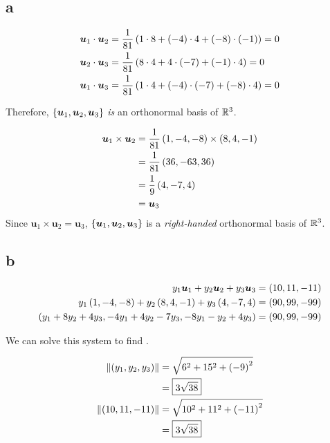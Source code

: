 \documentclass{article}
\begin{document}

\subsection*{a}

\begin{align*}
  \bm{u}_1 \cdot \bm{u}_2 &= \frac{1}{81} \left ( 1 \cdot 8 + \left ( -4 \right) \cdot 4 + \left ( -8 \right) \cdot \left ( -1 \right) \right) = 0 \\
  \bm{u}_2 \cdot \bm{u}_3 &= \frac{1}{81} \left ( 8 \cdot 4 + 4 \cdot \left ( -7 \right) + \left ( -1 \right) \cdot 4 \right) = 0 \\
  \bm{u}_1 \cdot \bm{u}_3 &= \frac{1}{81} \left ( 1 \cdot 4 + \left ( -4 \right) \cdot \left ( -7 \right) + \left ( -8 \right) \cdot 4 \right) = 0 \\
\end{align*}

Therefore, $\left \{ \bm{u}_1, \bm{u}_2, \bm{u}_3 \right \}$ \emph{is} an orthonormal basis of $\mathbb R^3$.

\begin{align*}
  \bm{u}_1 \times \bm{u}_2 &= \frac{1}{81} \left ( 1, -4, -8 \right) \times \left ( 8, 4, -1 \right) \\
                           &= \frac{1}{81} \left ( 36, -63, 36 \right) \\
                           &= \frac{1}{9} \left ( 4, -7, 4 \right) \\
                           &= \bm{u}_3 \\
\end{align*}
Since $\bm{u}_1 \times \bm{u}_2 = \bm{u}_3$, $\left \{ \bm{u}_1, \bm{u}_2, \bm{u}_3 \right \}$ is a \emph{right-handed} orthonormal basis of $\mathbb R^3$.


\subsection*{b}


\begin{align*}
  y_1 \bm{u}_1 + y_2 \bm{u}_2 + y_3 \bm{u}_3 &= \left ( 10, 11, -11 \right) \\
  y_1 \left ( 1, -4, -8 \right) + y_2 \left ( 8, 4, -1 \right) + y_3 \left ( 4, -7, 4 \right) &= \left ( 90, 99, -99 \right) \\
  \left ( y_1 + 8 y_2 + 4 y_3, -4 y_1 + 4 y_2 - 7 y_3, -8 y_1 - y_2 + 4y_3 \right) &= \left ( 90, 99, -99 \right) \\
\end{align*}

We can solve this system to find .

\begin{align*}
  \left\lVert\left ( y_1, y_2, y_3 \right)\right\rVert &= \sqrt{6^2 + 15^2 + \left ( -9 \right)^2} \\
                              &= \boxed{3 \sqrt{38}} \\
  \left\lVert\left ( 10, 11, -11 \right)\right\rVert &= \sqrt{10^2 + 11^2 + \left ( -11 \right)^2} \\
  &= \boxed{3 \sqrt{38}} \\
\end{align*}
\end{document}
